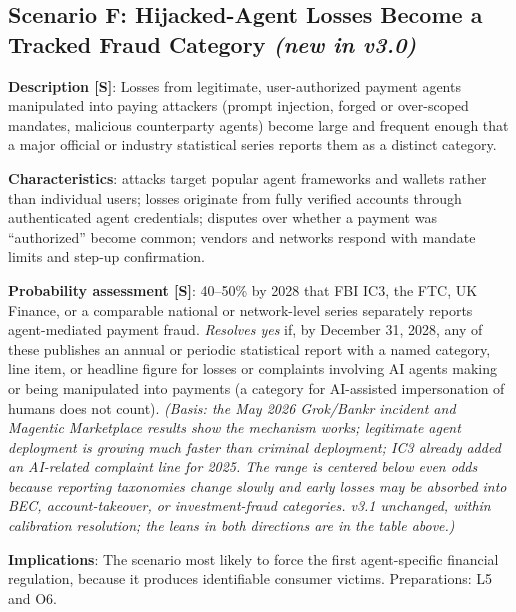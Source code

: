 \documentclass[11pt,letterpaper]{article}
\begin{document}
\subsection{Scenario F: Hijacked-Agent Losses Become a Tracked Fraud Category \textit{(new in v3.0)}}

\begin{scenariobox}
\textbf{Description [S]}: Losses from legitimate, user-authorized payment agents manipulated into paying attackers (prompt injection, forged or over-scoped mandates, malicious counterparty agents) become large and frequent enough that a major official or industry statistical series reports them as a distinct category.

\textbf{Characteristics}: attacks target popular agent frameworks and wallets rather than individual users; losses originate from fully verified accounts through authenticated agent credentials; disputes over whether a payment was ``authorized'' become common; vendors and networks respond with mandate limits and step-up confirmation.

\textbf{Probability assessment [S]}: 40--50\% by 2028 that FBI IC3, the FTC, UK Finance, or a comparable national or network-level series separately reports agent-mediated payment fraud. \textit{Resolves yes} if, by December 31, 2028, any of these publishes an annual or periodic statistical report with a named category, line item, or headline figure for losses or complaints involving AI agents making or being manipulated into payments (a category for AI-assisted impersonation of humans does not count). \textit{(Basis: the May 2026 Grok/Bankr incident and Magentic Marketplace results show the mechanism works; legitimate agent deployment is growing much faster than criminal deployment; IC3 already added an AI-related complaint line for 2025. The range is centered below even odds because reporting taxonomies change slowly and early losses may be absorbed into BEC, account-takeover, or investment-fraud categories. v3.1 unchanged, within calibration resolution; the leans in both directions are in the table above.)}

\textbf{Implications}: The scenario most likely to force the first agent-specific financial regulation, because it produces identifiable consumer victims. Preparations: L5 and O6.
\end{scenariobox}
\end{document}
